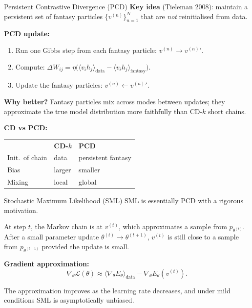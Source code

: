 \documentclass[aspectratio=169]{beamer}
\begin{document}
\begin{frame}{Persistent Contrastive Divergence (PCD)}
\textbf{Key idea} (Tieleman 2008): maintain a persistent set of fantasy particles
$\{v^{(n)}\}_{n=1}^N$ that are \emph{not} reinitialised from data.

\medskip
\textbf{PCD update:}
\begin{enumerate}
  \item Run one Gibbs step from each fantasy particle: $v^{(n)}\to v^{(n)}{}'$.
  \item Compute:
        $\Delta W_{ij} = \eta\bigl(\langle v_i h_j\rangle_{\mathrm{data}}
                         - \langle v_i h_j\rangle_{\mathrm{fantasy}}\bigr)$.
  \item Update the fantasy particles: $v^{(n)}\leftarrow v^{(n)}{}'$.
\end{enumerate}

\medskip
\textbf{Why better?} Fantasy particles mix across modes between updates; they
approximate the true model distribution more faithfully than CD-$k$ short chains.

\medskip
\textbf{CD vs PCD:}
\begin{tabular}{lll}
  & \textbf{CD-$k$} & \textbf{PCD} \\
  Init.\ of chain & data & persistent fantasy \\
  Bias & larger & smaller \\
  Mixing & local & global \\
\end{tabular}
\end{frame}

\begin{frame}{Stochastic Maximum Likelihood (SML)}
SML is essentially PCD with a rigorous motivation.

\medskip
At step $t$, the Markov chain is at $v^{(t)}$, which approximates a sample from
$p_{\theta^{(t)}}$.  After a small parameter update $\theta^{(t)}\to\theta^{(t+1)}$,
$v^{(t)}$ is still close to a sample from $p_{\theta^{(t+1)}}$ provided the
update is small.

\medskip
\textbf{Gradient approximation:}
\[
  \nabla_\theta\mathcal{L}(\theta)
  \approx
  \langle\nabla_\theta E_\theta\rangle_{\mathrm{data}}
  -
  \nabla_\theta E_\theta(v^{(t)}).
\]

The approximation improves as the learning rate decreases, and under mild
conditions SML is asymptotically unbiased.
\end{frame}
\end{document}
